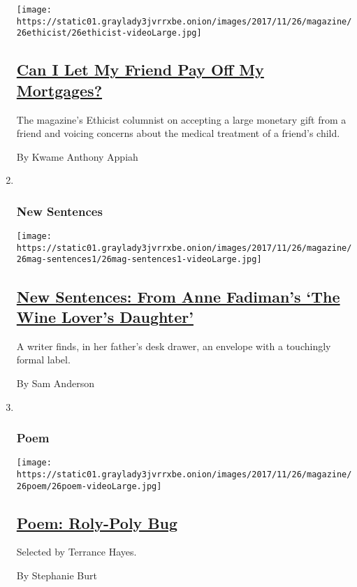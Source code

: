 \begin{enumerate}
  \texttt{[image: https://static01.graylady3jvrrxbe.onion/images/2017/11/26/magazine/26ethicist/26ethicist-videoLarge.jpg]}

  \hypertarget{can-i-let-my-friend-pay-off-my-mortgages}{%
  \subsection{\texorpdfstring{\href{/2017/11/20/magazine/can-i-let-my-friend-pay-off-my-mortgages.html}{Can
  I Let My Friend Pay Off My
  Mortgages?}}{Can I Let My Friend Pay Off My Mortgages?}}\label{can-i-let-my-friend-pay-off-my-mortgages}}

  The magazine's Ethicist columnist on accepting a large monetary gift
  from a friend and voicing concerns about the medical treatment of a
  friend's child.

  By Kwame Anthony Appiah
\item ~
  \hypertarget{new-sentences}{%
  \subsubsection{New Sentences}\label{new-sentences}}

  \texttt{[image: https://static01.graylady3jvrrxbe.onion/images/2017/11/26/magazine/26mag-sentences1/26mag-sentences1-videoLarge.jpg]}

  \hypertarget{new-sentences-from-anne-fadimans-the-wine-lovers-daughter}{%
  \subsection{\texorpdfstring{\href{/2017/11/22/magazine/new-sentences-from-anne-fadimans-the-wine-lovers-daughter.html}{New
  Sentences: From Anne Fadiman's `The Wine Lover's
  Daughter'}}{New Sentences: From Anne Fadiman's `The Wine Lover's Daughter'}}\label{new-sentences-from-anne-fadimans-the-wine-lovers-daughter}}

  A writer finds, in her father's desk drawer, an envelope with a
  touchingly formal label.

  By Sam Anderson
\item ~
  \hypertarget{poem}{%
  \subsubsection{Poem}\label{poem}}

  \texttt{[image: https://static01.graylady3jvrrxbe.onion/images/2017/11/26/magazine/26poem/26poem-videoLarge.jpg]}

  \hypertarget{poem-roly-poly-bug}{%
  \subsection{\texorpdfstring{\href{/2017/11/22/magazine/poem-roly-poly-bug.html}{Poem:
  Roly-Poly Bug}}{Poem: Roly-Poly Bug}}\label{poem-roly-poly-bug}}

  Selected by Terrance Hayes.

  By Stephanie Burt
\end{enumerate}

